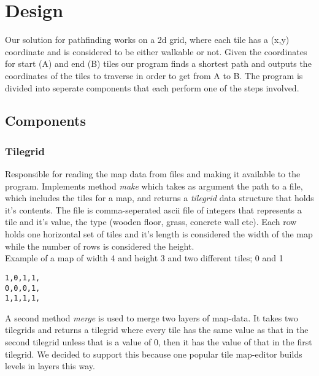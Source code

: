 \documentclass[12pt, a4paper]{article}
\begin{document}





\section{Design}
Our solution for pathfinding works on a 2d grid, where each tile has a (x,y) coordinate and is considered to be either walkable or not. Given the coordinates for start (A) and end (B) tiles our program finds a shortest path and outputs the coordinates of the tiles to traverse in order to get from A to B. The program is divided into seperate components that each perform one of the steps involved.

\subsection{Components}
\subsubsection{Tilegrid}

Responsible for reading the map data from files and making it available to the program. Implements method \textit{make} which takes as argument the path to a file, which includes the tiles for a map, and returns a \textit{tilegrid} data structure that holds it's contents. The file is comma-seperated ascii file of integers that represents a tile and it's value, the type (wooden floor, grass, concrete wall etc). Each row holds one horizontal set of tiles and it's length is considered the width of the map while the number of rows is considered the height.
\\Example of a map of width 4 and height 3 and two different tiles; 0 and 1

\texttt{1,0,1,1,\\
0,0,0,1,\\
1,1,1,1,\\
}

A second method \textit{merge} is used to merge two layers of map-data. It takes two tilegrids and returns a tilegrid where every tile has the same value as that in the second tilegrid unless that is a value of 0, then it has the value of that in the first tilegrid. We decided to support this because one popular tile map-editor\cite{mapeditor} builds levels in layers this way.
\end{document}

